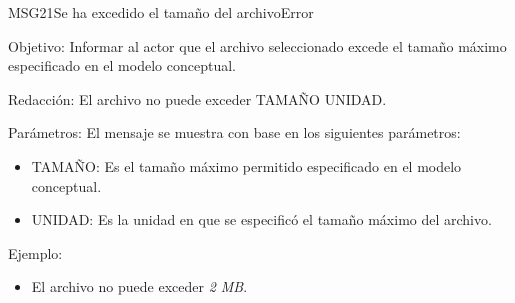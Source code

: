 \begin{mensaje}{MSG21}{Se ha excedido el tamaño del archivo}{Error}
	\item [Objetivo:] Informar al actor que el archivo seleccionado excede el tamaño máximo especificado en el modelo conceptual.
	\item[Redacción:] El archivo no puede exceder TAMAÑO UNIDAD.
	\item[Parámetros:] El mensaje se muestra con base en los siguientes parámetros:
	\begin{itemize}
		\item TAMAÑO: Es el tamaño máximo permitido especificado en el modelo conceptual.
		\item UNIDAD: Es la unidad en que se especificó el tamaño máximo del archivo.
	\end{itemize}
	\item[Ejemplo:] \begin{itemize}
		\item El archivo no puede exceder {\em 2 MB}.
	\end{itemize}
\end{mensaje}
